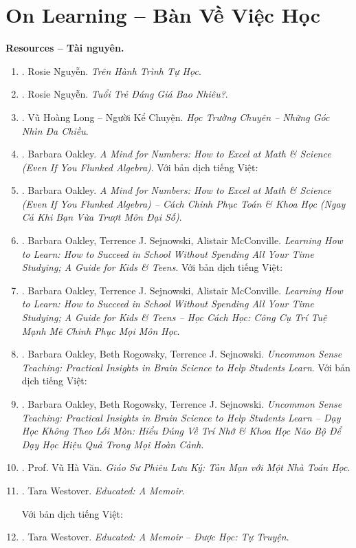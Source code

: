 \documentclass[12pt]{article}
\begin{document}
\section{On Learning -- Bàn Về Việc Học}
\label{sect: learning}
\textbf{\textsf{Resources -- Tài nguyên.}}
\begin{enumerate}
	\item \cite{Rosie_self_study}. {\sc Rosie Nguyễn}. {\it Trên Hành Trình Tự Học}.
	\item \cite{Rosie_youth}. {\sc Rosie Nguyễn}. {\it Tuổi Trẻ Đáng Giá Bao Nhiêu?}.
	\item \cite{Long2021}. {\sc Vũ Hoàng Long -- Người Kể Chuyện}. {\it Học Trường Chuyên -- Những Góc Nhìn Đa Chiều}.
	\item \cite{Oakley_mind_number}. {\sc Barbara Oakley}. {\it A Mind for Numbers: How to Excel at Math \& Science (Even If You Flunked Algebra)}. Với bản dịch tiếng Việt:
	\item \cite{Oakley_mind_number_VN}. {\sc Barbara Oakley}. {\it A Mind for Numbers: How to Excel at Math \& Science (Even If You Flunked Algebra) -- Cách Chinh Phục Toán \& Khoa Học (Ngay Cả Khi Bạn Vừa Trượt Môn Đại Số)}.
	\item \cite{Oakley_Sejnowski_McConville_learn_how_learn}. {\sc Barbara Oakley, Terrence J. Sejnowski, Alistair McConville}. {\it Learning How to Learn: How to Succeed in School Without Spending All Your Time Studying; A Guide for Kids \& Teens}. Với bản dịch tiếng Việt:
	\item \cite{Oakley_Sejnowski_McConville_learn_how_learn_VN}. {\sc Barbara Oakley, Terrence J. Sejnowski, Alistair McConville}. {\it Learning How to Learn: How to Succeed in School Without Spending All Your Time Studying; A Guide for Kids \& Teens -- Học Cách Học: Công Cụ Trí Tuệ Mạnh Mẽ Chinh Phục Mọi Môn Học}.
	\item \cite{Oakley_Rogowsky_Sejnowski_McConville_uncommon_sense_teaching}. {\sc Barbara Oakley, Beth Rogowsky, Terrence J. Sejnowski}. {\it Uncommon Sense Teaching: Practical Insights in Brain Science to Help Students Learn}. Với bản dịch tiếng Việt:
	\item \cite{Oakley_Rogowsky_Sejnowski_McConville_uncommon_sense_teaching_VN}. {\sc Barbara Oakley, Beth Rogowsky, Terrence J. Sejnowski}. {\it Uncommon Sense Teaching: Practical Insights in Brain Science to Help Students Learn -- Dạy Học Không Theo Lối Mòn: Hiểu Đúng Về Trí Nhớ \& Khoa Học Não Bộ Để Dạy Học Hiệu Quả Trong Mọi Hoàn Cảnh}.
	\item \cite{VanVu2022}. Prof. {\sc Vũ Hà Văn}. {\it Giáo Sư Phiêu Lưu Ký: Tản Mạn với Một Nhà Toán Học}.
	\item \cite{Westover_educated}. {\sc Tara Westover}. {\it Educated: A Memoir}.
	
	Với bản dịch tiếng Việt:
	\item \cite{Westover_educated_VN}. {\sc Tara Westover}. {\it Educated: A Memoir -- Được Học: Tự Truyện}.
\end{enumerate}
\end{document}
